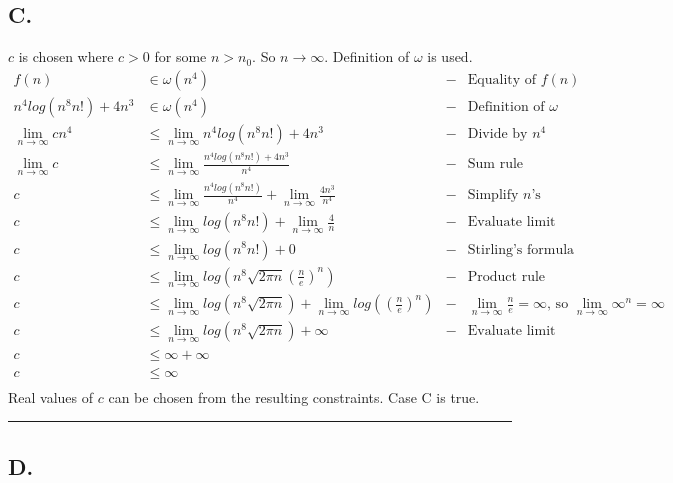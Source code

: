 \documentclass{article}
\begin{document}
\subsection*{C.} 

$c$ is chosen where $c > 0$ for some $n > n_{0}$. So $n \to \infty$. Definition of $\omega$ is used. 
\begingroup
\allowdisplaybreaks
\addtolength{\jot}{0.5em}
\begin{align*}
f(n) &\in \omega(n^{4}) &-& \text{Equality of } f(n) \\
n^{4}log(n^{8}n!) + 4n^{3} &\in \omega(n^{4}) &-& \text{Definition of } \omega \\
\lim _{n \to \infty } c n^{4} &\le \lim _{n \to \infty } n^{4}log(n^{8}n!) + 4n^{3} &-& \text{Divide by } n^{4} \\
\lim _{n \to \infty } c &\le \lim _{n \to \infty } \frac{n^{4}log(n^{8}n!) + 4n^{3}} {n^{4}} &-& \text{Sum rule} \\
c &\le \lim _{n \to \infty } \frac{n^{4}log(n^{8}n!)} {n^{4}} + \lim _{n \to \infty } \frac{4n^{3}} {n^{4}} &-& \text{Simplify } n \text{'s} \\
c &\le \lim _{n \to \infty } log(n^{8}n!) + \lim _{n \to \infty } \frac{4} {n} &-& \text{Evaluate limit} \\
c &\le \lim _{n \to \infty } log(n^{8}n!) + 0 &-& \text{Stirling's formula} \\
c &\le \lim _{n \to \infty } log\left( n^{8}\sqrt{2\pi n}\left(\frac{n}{e}\right)^{n}\right) &-& \text{Product rule} \\
c &\le \lim _{n \to \infty } log\left( n^{8}\sqrt{2\pi n}\right) + \lim _{n \to \infty } log\left(\left(\frac{n}{e}\right)^{n}\right) &-& \lim _{n \to \infty} \frac{n}{e} = \infty \text{, so } \lim _{n \to \infty} \infty^n = \infty \\
c &\le \lim _{n \to \infty } log\left( n^{8}\sqrt{2\pi n}\right) + \infty &-& \text{Evaluate limit} \\
c &\le \infty + \infty && \\
c &\le \infty && \\
\end{align*}
\endgroup
Real values of $c$ can be chosen from the resulting constraints. Case C is true. \\
\par\noindent\rule{\textwidth}{0.7pt}

\subsection*{D.}
\end{document}
